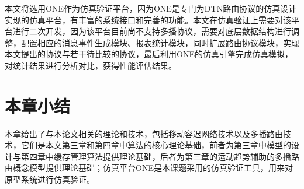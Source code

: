 本文将选用ONE作为仿真验证平台，因为ONE是专门为DTN路由协议的仿真设计实现的仿真平台，有丰富的系统接口和完善的功能。本文在仿真验证上需要对该平台进行二次开发，因为该平台目前尚不支持多播协议，需要对底层数据结构进行调整，配置相应的消息事件生成模块、报表统计模块，同时扩展路由协议模块，实现本文提出的协议与若干待比较的协议，最后利用ONE的仿真引擎完成仿真模拟，对统计结果进行分析对比，获得性能评估结果。

\section{本章小结}

本章给出了与本论文相关的理论和技术，包括移动容迟网络技术以及多播路由技术，它们是本文第三章和第四章中算法的核心理论基础，前者为第三章中模型的设计与第四章中缓存管理算法提供理论基础，后者为第三章的运动趋势辅助的多播路由概念模型提供理论基础；仿真平台ONE是本课题采用的仿真验证工具，用来对原型系统进行仿真验证。

